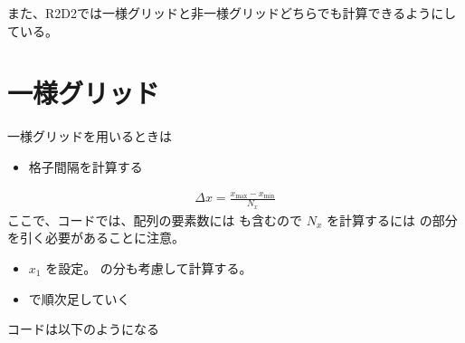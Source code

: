 \documentclass[letterpaper,10pt,dvipdfmx,report]{sphinxmanual}
\begin{document}
また、R2D2では一様グリッドと非一様グリッドどちらでも計算できるようにしている。


\section{一様グリッド}
\label{\detokenize{geometry:id2}}
一様グリッドを用いるときは
\begin{itemize}
\item {} 
格子間隔を計算する

\end{itemize}
\begin{equation*}
\begin{split}\Delta x = \frac{x_\mathrm{max} - x_\mathrm{min}}{N_x}\end{split}
\end{equation*}
ここで、コードでは、配列の要素数には  も含むので
\(N_x\) を計算するには  の部分を引く必要があることに注意。
\begin{itemize}
\item {} 
\(x_1\) を設定。 の分も考慮して計算する。

\item {} 
 で順次足していく

\end{itemize}

コードは以下のようになる

\begin{sphinxVerbatim}[commandchars=\\\{\}]
  
    
   
  
            
\end{sphinxVerbatim}
\end{document}

